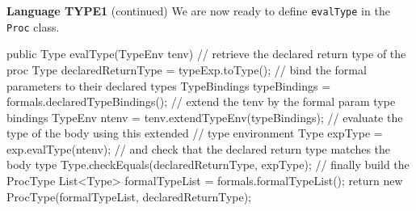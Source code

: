 \begin{minipage}[t]{\sw}
\slidenumber
\LARGE
{\bf Language TYPE1} (continued)\exx
We are now ready to define \verb'evalType' in the \verb'Proc' class.
\Large
\begin{qv}
public Type evalType(TypeEnv tenv) {
    // retrieve the declared return type of the proc
    Type declaredReturnType = typeExp.toType();
    // bind the formal parameters to their declared types
    TypeBindings typeBindings = formals.declaredTypeBindings();
    // extend the tenv by the formal param type bindings
    TypeEnv ntenv = tenv.extendTypeEnv(typeBindings);
    // evaluate the type of the body using this extended
    // type environment
    Type expType = exp.evalType(ntenv);
    // and check that the declared return type matches the body type
    Type.checkEquals(declaredReturnType, expType);
    // finally build the ProcType
    List<Type> formalTypeList = formals.formalTypeList();
    return new ProcType(formalTypeList, declaredReturnType);
}
\end{qv}
\end{minipage}
